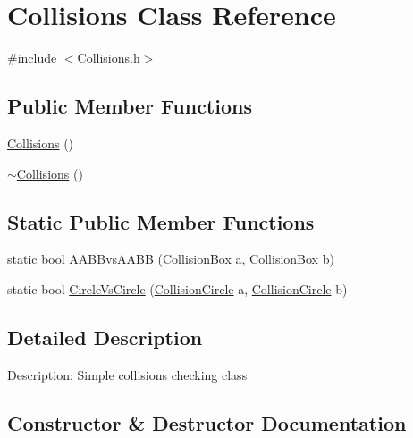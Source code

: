 \hypertarget{class_collisions}{}\section{Collisions Class Reference}
\label{class_collisions}


{\ttfamily \#include $<$Collisions.\+h$>$}

\subsection*{Public Member Functions}
\begin{DoxyCompactItemize}
\item 
\mbox{\hyperlink{class_collisions_a006630da4b62b10ebf123c6333c2b198}{Collisions}} ()
\item 
\mbox{\hyperlink{class_collisions_a39a613fd2a130b096c616f74f776d2f9}{$\sim$\+Collisions}} ()
\end{DoxyCompactItemize}
\subsection*{Static Public Member Functions}
\begin{DoxyCompactItemize}
\item 
static bool \mbox{\hyperlink{class_collisions_a5378f9cb303a13969bb64901027e1ca1}{A\+A\+B\+Bvs\+A\+A\+BB}} (\mbox{\hyperlink{class_collision_box}{Collision\+Box}} a, \mbox{\hyperlink{class_collision_box}{Collision\+Box}} b)
\item 
static bool \mbox{\hyperlink{class_collisions_adb221a509a95e71fb6002c9f0b59fee8}{Circle\+Vs\+Circle}} (\mbox{\hyperlink{class_collision_circle}{Collision\+Circle}} a, \mbox{\hyperlink{class_collision_circle}{Collision\+Circle}} b)
\end{DoxyCompactItemize}


\subsection{Detailed Description}
Description\+: Simple collisions checking class 

\subsection{Constructor \& Destructor Documentation}
\mbox{\label{class_collisions_a006630da4b62b10ebf123c6333c2b198}} 

